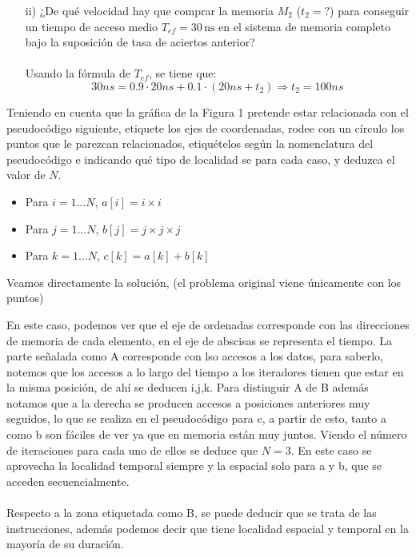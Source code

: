 \begin{ejercicio}
\begin{itemize}
\begin{itemize}
            \item[ii)] ¿De qué velocidad hay que comprar la memoria \( M_2 \) (\( t_2 = ? \)) para conseguir un tiempo de acceso medio \( T_{ef} = 30 \, \text{ns} \) en el sistema de memoria completo bajo la suposición de tasa de aciertos anterior?
                \\ \\
                Usando la fórmula de \( T_{ef} \), se tiene que:
                \begin{equation*}
                    30ns = 0.9 \cdot 20ns + 0.1 \cdot (20ns + t_2) \Rightarrow t_2 = 100ns
                \end{equation*}
        \end{itemize}
    \end{itemize}
\end{ejercicio}

\begin{ejercicio}
    Teniendo en cuenta que la gráfica de la Figura 1 pretende estar relacionada con el pseudocódigo siguiente, etiquete los ejes de coordenadas, 
    rodee con un círculo los puntos que le parezcan relacionados, etiquételos según la nomenclatura del pseudocódigo e indicando qué tipo de localidad se para cada caso, y deduzca el 
    valor de \( N \).
    \begin{itemize}
        \item Para \( i = 1 \dots N \), \( a[i] = i \times i \)
        \item Para \( j = 1 \dots N \), \( b[j] = j \times j \times j \)
        \item Para \( k = 1 \dots N \), \( c[k] = a[k] + b[k] \)
    \end{itemize}
    Veamos directamente la solución, (el problema original viene únicamente con los puntos)
    \begin{center}
        
    \end{center}
    En este caso, podemos ver que el eje de ordenadas corresponde con las direcciones de memoria de cada elemento,
    en el eje de abscisas se representa el tiempo. La parte señalada como A
    corresponde con lso accesos a los datos, para saberlo, notemos que los accesos a lo largo del tiempo a los iteradores
    tienen que estar en la misma posición, de ahí se deducen i,j,k. Para distinguir A de B además notamos que a la derecha
    se producen accesos a posiciones anteriores muy seguidos, lo que se realiza en el pseudocódigo para c, a partir de esto,
    tanto a como b son fáciles de ver ya que en memoria están muy juntos. Viendo el número de iteraciones para cada uno de ellos
    se deduce que $N = 3$. En este caso se aprovecha la localidad temporal siempre y la espacial solo para a y b, que se acceden secuencialmente.
    \\ \\
    Respecto a la zona etiquetada como B, se puede deducir que se trata de las instrucciones, además podemos decir que tiene localidad espacial y
    temporal en la mayoría de su duración.
\end{ejercicio}

